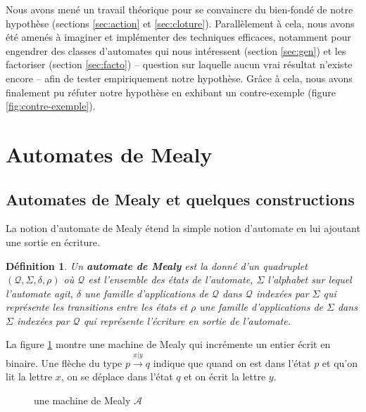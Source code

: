 \documentclass[11pt,a4paper]{article}
\newtheorem{definition}{Définition}
\begin{document}
Nous avons mené un travail théorique pour se convaincre du bien-fondé de notre hypothèse (sections \ref{sec:action} et \ref{sec:cloture}). Parallèlement à cela, nous avons été amenés à imaginer et implémenter des techniques efficaces, notamment pour engendrer des classes d'automates qui nous intéressent (section \ref{sec:gen}) et les factoriser (section \ref{sec:facto}) -- question sur laquelle aucun vrai résultat n'existe encore -- afin de tester empiriquement notre hypothèse. Grâce à cela, nous avons finalement pu réfuter notre hypothèse en exhibant un contre-exemple (figure \ref{fig:contre-exemple}).

\section{Automates de Mealy}

\subsection{Automates de Mealy et quelques constructions}

La notion d'automate de Mealy étend la simple notion d'automate en lui ajoutant une sortie en écriture.

\begin{definition}
  Un \textbf{automate de Mealy} est la donné d'un quadruplet $\left(\mathcal{Q}, \Sigma, \delta, \rho\right)$ où $\mathcal{Q}$ est l'ensemble des états de l'automate, $\Sigma$ l'alphabet sur lequel l'automate agit, $\delta$ une famille d'applications de $\mathcal{Q}$ dans $\mathcal{Q}$ indexées par $\Sigma$ qui représente les transitions entre les états et $\rho$ une famille d'applications de $\Sigma$ dans $\Sigma$ indexées par $\mathcal{Q}$ qui représente l'écriture en sortie de l'automate.
\end{definition}

La figure \ref{fig:example} montre une machine de Mealy qui incrémente un entier écrit en binaire. Une flèche du type $p\overset{x|y}{\longrightarrow}q$ indique que quand on est dans l'état $p$ et qu'on lit la lettre $x$, on se déplace dans l'état $q$ et on écrit la lettre $y$.

\begin{figure}[!ht]
  \begin{center}
    \caption{une machine de Mealy $\mathcal{A}$ \label{fig:example}}
  \end{center}
\end{figure}
\end{document}
